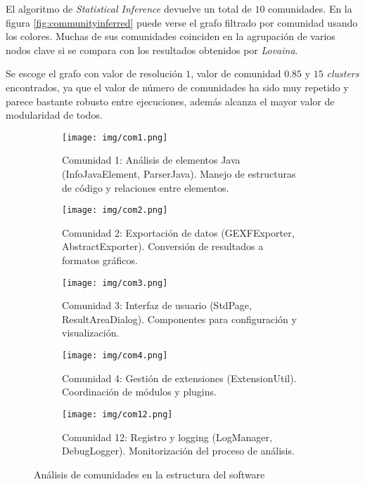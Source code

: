 \documentclass[12pt,letterpaper]{article}
\begin{document}
El algoritmo de \textit{Statistical Inference} devuelve un total de $10$ comunidades. En la figura \ref{fig:communityinferred} puede verse el grafo filtrado por comunidad usando los colores. Muchas de sus comunidades coinciden en la agrupación de varios nodos clave si se compara con los resultados obtenidos por \textit{Lovaina}.

Se escoge el grafo con valor de resolución $1$, valor de comunidad $0.85$ y $15$ \textit{clusters} encontrados, ya que el valor de número de comunidades ha sido muy repetido y parece bastante robusto entre ejecuciones, además alcanza el mayor valor de modularidad de todos.

\begin{figure}[htp]
    \centering
    \begin{subfigure}[htp]{0.3\textwidth}
        \texttt{[image: img/com1.png]}
        \caption{Comunidad 1: Análisis de elementos Java (InfoJavaElement, ParserJava). Manejo de estructuras de código y relaciones entre elementos.}
        \label{fig:comunidad1}
    \end{subfigure}
    \hfill
    \begin{subfigure}[htp]{0.3\textwidth}
        \texttt{[image: img/com2.png]}
        \caption{Comunidad 2: Exportación de datos (GEXFExporter, AbstractExporter). Conversión de resultados a formatos gráficos.}
        \label{fig:comunidad2}
    \end{subfigure}
    \hfill
    \begin{subfigure}[htp]{0.3\textwidth}
        \texttt{[image: img/com3.png]}
        \caption{Comunidad 3: Interfaz de usuario (StdPage, ResultAreaDialog). Componentes para configuración y visualización.}
        \label{fig:comunidad3}
    \end{subfigure}
    \vspace{0.5cm}
    \begin{subfigure}[htp]{0.3\textwidth}
        \texttt{[image: img/com4.png]}
        \caption{Comunidad 4: Gestión de extensiones (ExtensionUtil). Coordinación de módulos y plugins.}
        \label{fig:comunidad4}
    \end{subfigure}
    \hfill
    \begin{subfigure}[htp]{0.3\textwidth}
        \texttt{[image: img/com12.png]}
        \caption{Comunidad 12: Registro y logging (LogManager, DebugLogger). Monitorización del proceso de análisis.}
        \label{fig:comunidad12}
    \end{subfigure}
    \hfill
    \begin{subfigure}[htp]{0.3\textwidth}
        \phantom{} %
    \end{subfigure}
    \caption{Análisis de comunidades en la estructura del software}
    \label{fig:comunidades}
\end{figure}
\end{document}
